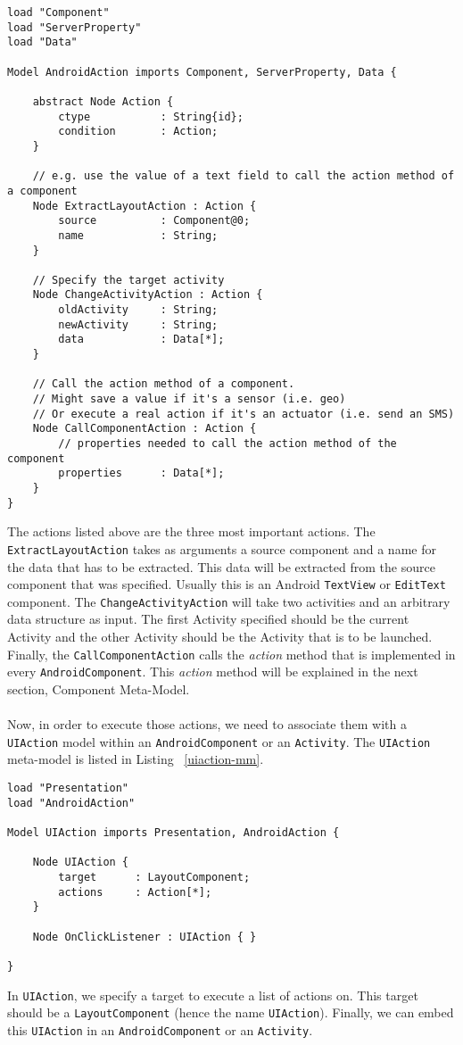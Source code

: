 \begin{lstlisting}[label=androidaction-mm,caption=AndroidAction meta-model, captionpos=t]
load "Component"
load "ServerProperty"
load "Data"

Model AndroidAction imports Component, ServerProperty, Data {
	
	abstract Node Action {
		ctype			: String{id};
		condition 		: Action;
	}

	// e.g. use the value of a text field to call the action method of a component
	Node ExtractLayoutAction : Action {
		source 			: Component@0;
		name 			: String;
	}

	// Specify the target activity
	Node ChangeActivityAction : Action {
		oldActivity 	: String;
		newActivity 	: String;
		data 			: Data[*];
	}

	// Call the action method of a component.
	// Might save a value if it's a sensor (i.e. geo)
	// Or execute a real action if it's an actuator (i.e. send an SMS)
	Node CallComponentAction : Action {
		// properties needed to call the action method of the component
		properties		: Data[*];
	}
}
\end{lstlisting}
The actions listed above are the three most important actions. The \texttt{ExtractLayoutAction} takes as arguments a source component and a name for the data that has to be extracted. This data will be extracted from the source component that was specified. Usually this is an Android \texttt{TextView} or \texttt{EditText} component. The \texttt{ChangeActivityAction} will take two activities and an arbitrary data structure as input. The first Activity specified should be the current Activity and the other Activity should be the Activity that is to be launched. Finally, the \texttt{CallComponentAction} calls the \textit{action} method that is implemented in every \texttt{AndroidComponent}. This \textit{action} method will be explained in the next section, Component Meta-Model. \\ \\
Now, in order to execute those actions, we need to associate them with a \texttt{UIAction} model within an \texttt{AndroidComponent} or an \texttt{Activity}. The \texttt{UIAction} meta-model is listed in Listing ~\ref{uiaction-mm}.

\begin{lstlisting}[label=uiaction-mm,caption=UIAction meta-model, captionpos=t]
load "Presentation"
load "AndroidAction"

Model UIAction imports Presentation, AndroidAction {
	
	Node UIAction {
		target 		: LayoutComponent;
		actions 	: Action[*];
	}

	Node OnClickListener : UIAction { }

}
\end{lstlisting}
In \texttt{UIAction}, we specify a target to execute a list of actions on. This target should be a \texttt{LayoutComponent} (hence the name \texttt{UIAction}). Finally, we can embed this \texttt{UIAction} in an \texttt{AndroidComponent} or an \texttt{Activity}.


